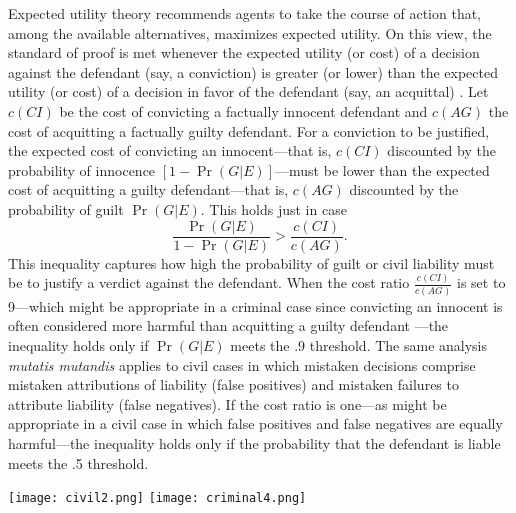 \documentclass{article}
\begin{document}

  Expected utility theory recommends agents to take the course of action that, among the available alternatives,  maximizes expected utility. On this view, 
the standard of proof is met whenever the expected utility (or cost) of a decision against the defendant (say, a conviction) is greater (or lower) than the expected utility (or cost) of a decision in favor of the defendant (say, an acquittal) \citep{kaplan1968decision, Dekay1996, hamer2004}.
Let $c(CI)$ be the cost of convicting a factually innocent defendant and $c(AG)$ the cost of acquitting a factually guilty defendant. For a conviction to be justified, the expected cost of convicting an innocent---that is, $c(CI)$  discounted by the probability of innocence $[1-\Pr(G|E)]$---must be lower than the expected cost of acquitting a guilty defendant---that is, $c(AG)$ discounted by the probability of guilt $\Pr(G|E)$. This holds just in case 
%
\[ \frac{\Pr(G|E)}{1- \Pr(G|E)} > \frac{c(CI)}{c(AG)}.\]
%
This inequality captures 
how high the probability 
of guilt or civil liability must be to justify a verdict against the defendant. 
When the cost ratio $\frac{c(CI)}{c(AG)}$ is set to 9---which might be appropriate in a criminal 
case since convicting an innocent is often considered more harmful than acquitting a guilty defendant \citep[however, see ][]{laudan2016law} ---the inequality holds only if $\Pr(G | E)$ meets the .9 threshold.
%
The same analysis \textit{mutatis mutandis} applies to civil cases in which mistaken decisions comprise mistaken attributions of liability (false positives) and mistaken failures to attribute liability (false negatives). If the cost ratio is one---as might be appropriate in a civil case in which false positives and false negatives are equally harmful---the inequality holds only if the probability that the defendant is liable meets the .5 threshold. %


%
%


\begin{center}
\texttt{[image: civil2.png]}
\texttt{[image: criminal4.png]}   
\end{center}
\end{document}
